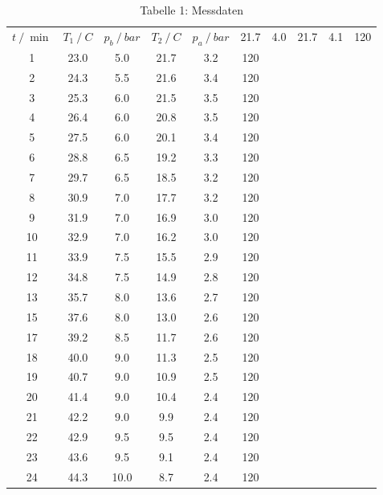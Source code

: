 \begin{table}
    \centering
    \caption{Tabelle 1: Messdaten}
    \label{tab:Messdaten}
    \begin{tabular}{S[table-format = 2.0] S[table-format = 2.1] S[table-format = 2.2] S[table-format = 2.1] S[table-format = 1.1] S[table-format = 3.0]}
        \toprule
        {$t \mathbin{/} \si{\min}$}
        & {$T_1 \mathbin{/} C$} & {$p_b \mathbin{/} bar$}
        & {$T_2 \mathbin{/} C$} & {$p_a \mathbin{/} bar$}
         &    21.7 &	 4.0  &	21.7 &  4.1  &  120 \\
         1 &    23.0 &	 5.0  &	21.7 &	3.2	 &  120 \\
         2 &	24.3 &	 5.5  &	21.6 &	3.4	 &  120 \\
         3 &	25.3 &   6.0  &	21.5 &	3.5	 &  120 \\
         4 &	26.4 & 	 6.0  &	20.8 &	3.5	 &  120 \\
         5 &	27.5 &	 6.0  &	20.1 &	3.4	 &  120 \\
         6 &	28.8 &	 6.5  &	19.2 &	3.3  &	120 \\
         7 &	29.7 &	 6.5  &	18.5 &	3.2	 &  120 \\
         8 &	30.9 &	 7.0  &	17.7 &	3.2	 &  120 \\
         9 &	31.9 &	 7.0  &	16.9 &	3.0	 &  120 \\
        10 &	32.9 &   7.0  &	16.2 &	3.0	 &  120 \\
        11 &	33.9 &	 7.5  &	15.5 &	2.9  &	120 \\
        12 &	34.8 &	 7.5  &	14.9 &	2.8	 &  120 \\
        13 &	35.7 &	 8.0  &	13.6 &	2.7  &	120 \\
        15 &	37.6 &	 8.0  &	13.0 & 	2.6	 &  120 \\
        17 &	39.2 &	 8.5  &	11.7 &	2.6	 &  120 \\
        18 &	40.0 &	 9.0  &	11.3 &	2.5	 &  120 \\
        19 &	40.7 &	 9.0  &	10.9 &	2.5  &	120 \\
        20 &	41.4 &	 9.0  &	10.4 &	2.4  &	120 \\
        21 & 	42.2 &	 9.0  &	 9.9 &  2.4  & 	120 \\
        22 &	42.9 &	 9.5  &	 9.5 &  2.4	 &  120 \\
        23 &	43.6 &	 9.5  &  9.1 &  2.4	 &  120 \\
        24 &	44.3 &	10.0  &	 8.7 &  2.4	 &  120 \\

\end{tabular}
\end{table}
